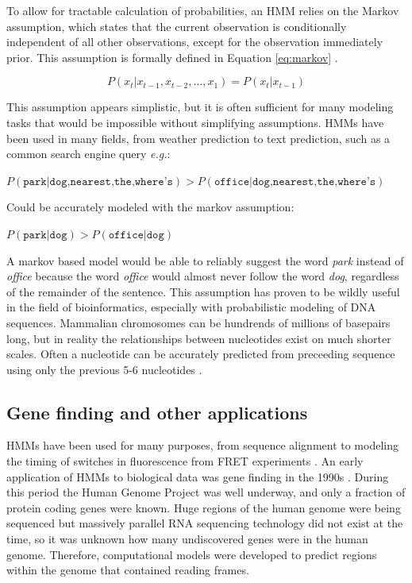 To allow for tractable calculation of probabilities, an HMM relies on the Markov assumption, which states that the current observation is conditionally independent of all other observations, except for the observation immediately prior. This assumption is formally defined in Equation \ref{eq:markov} \cite{Rabiner1989ARecognition}.

\begin{equation}
    P(x_t|x_{t-1},x_{t-2},\dots,x_1) = P(x_t | x_{t-1})
\label{eq:markov}
\end{equation}

This assumption appears simplistic, but it is often sufficient for many modeling tasks that would be impossible without simplifying assumptions. HMMs have been used in many fields, from weather prediction to text prediction, such as a common search engine query \emph{e.g.}: 

\begin{center}
    $P(\texttt{park} | \texttt{dog,nearest,the,where's}) > P(\texttt{office} | \texttt{dog,nearest,the,where's}) $
\end{center}

Could be accurately modeled with the markov assumption:

\begin{center}
    $P(\texttt{park} | \texttt{dog}) > P(\texttt{office} | \texttt{dog}) $
\end{center}

A markov based model would be able to reliably suggest the word \emph{park} instead of \emph{office} because the word \emph{office} would almost never follow the word \emph{dog}, regardless of the remainder of the sentence. This assumption has proven to be wildly useful in the field of bioinformatics, especially with probabilistic modeling of DNA sequences. Mammalian chromosomes can be hundrends of millions of basepairs long, but in reality the relationships between nucleotides exist on much shorter scales. Often a nucleotide can be accurately predicted from preceeding sequence using only the previous 5-6 nucleotides \cite{Burge1997PredictionDNA}.

\subsection{Gene finding and other applications}
HMMs have been used for many purposes, from sequence alignment \cite{Wheeler2013Nhmmer:HMMs} to modeling the timing of switches in fluorescence from FRET experiments \cite{Sgouralis2017AnAnalysis}. An early application of HMMs to biological data was gene finding in the 1990s \cite{Burge1997PredictionDNA}. During this period the Human Genome Project was well underway, and only a fraction of protein coding genes were known. Huge regions of the human genome were being sequenced but massively parallel RNA sequencing technology did not exist at the time, so it was unknown how many undiscovered genes were in the human genome. Therefore, computational models were developed to predict regions within the genome that contained reading frames\cite{Burge1997PredictionDNA,Pachter2002ApplicationsProblems,Henderson1997FindingModel}. 

